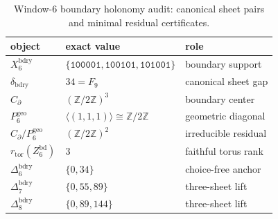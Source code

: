 \begin{table}[H]
\centering
\scriptsize
\setlength{\tabcolsep}{6pt}
\caption{Window-6 boundary holonomy audit: canonical sheet pairs and minimal residual certificates.}
\label{tab:window6_boundary_holonomy_audit}
\begin{tabular}{l l l}
\toprule
object & exact value & role\\
\midrule
$X_6^{\mathrm{bdry}}$ & $\{\texttt{100001},\texttt{100101},\texttt{101001}\}$ & boundary support\\
$\delta_{\mathrm{bdry}}$ & $34=F_9$ & canonical sheet gap\\
$C_{\partial}$ & $(\mathbb Z/2\mathbb Z)^3$ & boundary center\\
$P_6^{\mathrm{geo}}$ & $\langle(1,1,1)\rangle\cong\mathbb Z/2\mathbb Z$ & geometric diagonal\\
$C_{\partial}/P_6^{\mathrm{geo}}$ & $(\mathbb Z/2\mathbb Z)^2$ & irreducible residual\\
$r_{\mathrm{tor}}(Z_6^{\mathrm{bd}})$ & $3$ & faithful torus rank\\
$\Delta_6^{\mathrm{bdry}}$ & $\{0,34\}$ & choice-free anchor\\
$\Delta_7^{\mathrm{bdry}}$ & $\{0,55,89\}$ & three-sheet lift\\
$\Delta_8^{\mathrm{bdry}}$ & $\{0,89,144\}$ & three-sheet lift\\
\bottomrule
\end{tabular}
\end{table}
